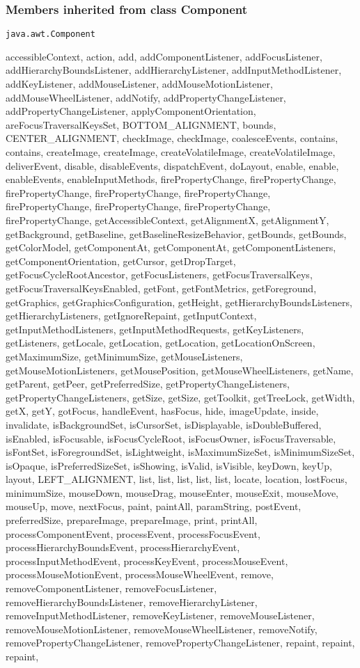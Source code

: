 {{{{{{{{{\subsubsection{Members inherited from class Component }{
\texttt{java.awt.Component} {\small 
{}}
{\small 

accessibleContext, action, add, addComponentListener, addFocusListener, addHierarchyBoundsListener, addHierarchyListener, addInputMethodListener, addKeyListener, addMouseListener, addMouseMotionListener, addMouseWheelListener, addNotify, addPropertyChangeListener, addPropertyChangeListener, applyComponentOrientation, areFocusTraversalKeysSet, BOTTOM\_ALIGNMENT, bounds, CENTER\_ALIGNMENT, checkImage, checkImage, coalesceEvents, contains, contains, createImage, createImage, createVolatileImage, createVolatileImage, deliverEvent, disable, disableEvents, dispatchEvent, doLayout, enable, enable, enableEvents, enableInputMethods, firePropertyChange, firePropertyChange, firePropertyChange, firePropertyChange, firePropertyChange, firePropertyChange, firePropertyChange, firePropertyChange, firePropertyChange, getAccessibleContext, getAlignmentX, getAlignmentY, getBackground, getBaseline, getBaselineResizeBehavior, getBounds, getBounds, getColorModel, getComponentAt, getComponentAt, getComponentListeners, getComponentOrientation, getCursor, getDropTarget, getFocusCycleRootAncestor, getFocusListeners, getFocusTraversalKeys, getFocusTraversalKeysEnabled, getFont, getFontMetrics, getForeground, getGraphics, getGraphicsConfiguration, getHeight, getHierarchyBoundsListeners, getHierarchyListeners, getIgnoreRepaint, getInputContext, getInputMethodListeners, getInputMethodRequests, getKeyListeners, getListeners, getLocale, getLocation, getLocation, getLocationOnScreen, getMaximumSize, getMinimumSize, getMouseListeners, getMouseMotionListeners, getMousePosition, getMouseWheelListeners, getName, getParent, getPeer, getPreferredSize, getPropertyChangeListeners, getPropertyChangeListeners, getSize, getSize, getToolkit, getTreeLock, getWidth, getX, getY, gotFocus, handleEvent, hasFocus, hide, imageUpdate, inside, invalidate, isBackgroundSet, isCursorSet, isDisplayable, isDoubleBuffered, isEnabled, isFocusable, isFocusCycleRoot, isFocusOwner, isFocusTraversable, isFontSet, isForegroundSet, isLightweight, isMaximumSizeSet, isMinimumSizeSet, isOpaque, isPreferredSizeSet, isShowing, isValid, isVisible, keyDown, keyUp, layout, LEFT\_ALIGNMENT, list, list, list, list, list, locate, location, lostFocus, minimumSize, mouseDown, mouseDrag, mouseEnter, mouseExit, mouseMove, mouseUp, move, nextFocus, paint, paintAll, paramString, postEvent, preferredSize, prepareImage, prepareImage, print, printAll, processComponentEvent, processEvent, processFocusEvent, processHierarchyBoundsEvent, processHierarchyEvent, processInputMethodEvent, processKeyEvent, processMouseEvent, processMouseMotionEvent, processMouseWheelEvent, remove, removeComponentListener, removeFocusListener, removeHierarchyBoundsListener, removeHierarchyListener, removeInputMethodListener, removeKeyListener, removeMouseListener, removeMouseMotionListener, removeMouseWheelListener, removeNotify, removePropertyChangeListener, removePropertyChangeListener, repaint, repaint, repaint, }}}}}}}}}}}
